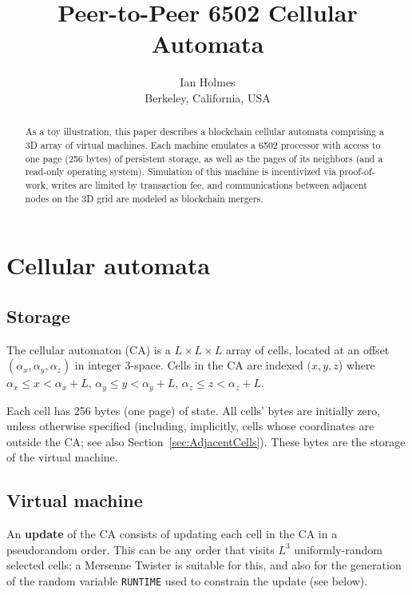 \documentclass{article}
\begin{document}
\title{Peer-to-Peer 6502 Cellular Automata}
\author{Ian Holmes \\ Berkeley, California, USA}

\maketitle


\begin{abstract}
  As a toy illustration,
  this paper describes a blockchain cellular automata
  comprising a 3D array of virtual machines.
  Each machine emulates a 6502 processor with access to one page (256 bytes) of persistent storage,
  as well as the pages of its neighbors (and a read-only operating system).
  Simulation of this machine is incentivized via proof-of-work,
  writes are limited by transaction fee,
  and communications between adjacent nodes on the 3D grid are modeled as blockchain mergers.
\end{abstract}

\section{Cellular automata}

\subsection{Storage}
\label{sec:Storage}

The cellular automaton (CA) is a $L \times L \times L$ array of cells,
located at an offset $(\alpha_x,\alpha_y,\alpha_z)$ in integer 3-space.
Cells in the CA are indexed $(x,y,z$) where
$\alpha_x \leq x < \alpha_x+L$,
$\alpha_y \leq y < \alpha_y+L$,
$\alpha_z \leq z < \alpha_z+L$.

Each cell has 256 bytes (one page) of state.
All cells' bytes are initially zero, unless otherwise specified
(including, implicitly, cells whose coordinates are outside the CA; see also Section~\ref{sec:AdjacentCells}).
These bytes are the storage of the virtual machine.

\subsection{Virtual machine}

An {\bf update} of the CA consists of updating each cell in the CA in a pseudorandom order.
This can be any order that visits $L^3$ uniformly-random selected cells;
a Mersenne Twister is suitable for this,
and also for the generation of the random variable {\tt RUNTIME} used to constrain the update (see below).
\end{document}

